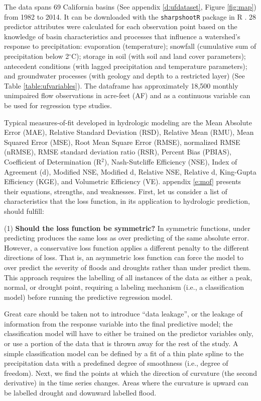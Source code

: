 The data spans 69 California basins (See appendix \ref{d:ufdataset}, Figure \ref{fig:map}) from 1982 to 2014. It can be downloaded with the {\tt sharpshootR} package in R \cite{beaudette2016package}. 28 predictor attributes were calculated for each observation point based on the knowledge of basin characteristics and processes that influence a watershed's response to precipitation: evaporation (temperature); snowfall (cumulative sum of precipitation below 2$^{\circ}$C); storage in soil (with soil and land cover parameters); antecedent conditions (with lagged precipitation and temperature parameters); and groundwater processes (with geology and depth to a restricted layer) (See Table \ref{table:ufvariables}). The dataframe has approximately 18,500 monthly unimpaired flow observations in acre-feet (AF) and as a continuous variable can be used for regression type studies. 

Typical measures-of-fit developed in hydrologic modeling are the Mean Absolute Error (MAE), Relative Standard Deviation (RSD), Relative Mean (RMU), Mean Squared Error (MSE), Root Mean Square Error (RMSE), normalized RMSE (nRMSE), RMSE standard deviation ratio (RSR), Percent Bias (PBIAS), Coefficient of Determination (R$^2$), Nash-Sutcliffe Efficiency (NSE), Index of Agreement (d), Modified NSE, Modified d, Relative NSE, Relative d, King-Gupta Efficiency (KGE), and Volumetric Efficiency (VE). appendix \ref{e:mof} presents their equations, strengths, and weaknesses. First, let us consider a list of characteristics that the loss function, in its application to hydrologic prediction, should fulfill:

(1) \textbf{Should the loss function be symmetric?} In symmetric functions, under predicting produces the same loss as over predicting of the same absolute error. However, a conservative loss function applies a different penalty to the different directions of loss. That is, an asymmetric loss function can force the model to over predict the severity of floods and droughts rather than under predict them. This approach requires the labelling of all instances of the data as either a peak, normal, or drought point, requiring a labeling mechanism (i.e., a classification model) before running the predictive regression model. 

Great care should be taken not to introduce ``data leakage'', or the leakage of information from the response variable into the final predictive model; the classification model will have to either be trained on the predictor variables only, or use a portion of the data that is thrown away for the rest of the study. A simple classification model can be defined by a fit of a thin plate spline to the precipitation data with a predefined degree of smoothness (i.e., degree of freedom). Next, we find the points at which the direction of curvature (the second derivative) in the time series changes. Areas where the curvature is upward can be labelled drought and downward labelled flood. 

